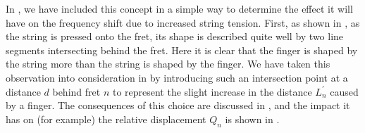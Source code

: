 
In , we have included this concept in a simple way to determine the effect it will have on the frequency shift due to increased string tension. First, as shown in , as the string is pressed onto the fret, its shape is described quite well by two line segments intersecting behind the fret. Here it is clear that the finger is shaped by the string more than the string is shaped by the finger. We have taken this observation into consideration in  by introducing such an intersection point at a distance $d$ behind fret $n$ to represent the slight increase in the distance $L_n^\prime$ caused by a finger. The consequences of this choice are discussed in , and the impact it has on (for example) the relative displacement $Q_n$ is shown in .



